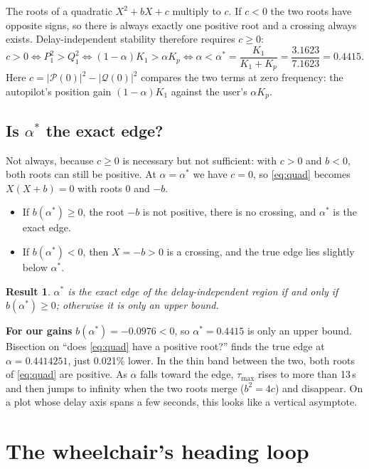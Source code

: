 \documentclass[11pt,a4paper]{article}
\newtheorem{result}{Result}
\theoremstyle{definition}
\begin{document}
The roots of a quadratic $X^2 + bX + c$ multiply to $c$. If $c < 0$ the
two roots have opposite signs, so there is always exactly one positive
root and a crossing always exists. Delay-independent stability
therefore requires $c \ge 0$:
\begin{equation}
c > 0 \iff P_1^2 > Q_1^2 \iff (1-\alpha)K_1 > \alpha K_p
\iff \alpha < \alpha^{*} = \frac{K_1}{K_1 + K_p} = \frac{3.1623}{7.1623} = 0.4415 .
\label{eq:astar}
\end{equation}
Here $c = |\mathcal{P}(0)|^2 - |\mathcal{Q}(0)|^2$ compares the two
terms at zero frequency: the autopilot's position gain $(1-\alpha)K_1$
against the user's $\alpha K_p$.

\subsection{Is \texorpdfstring{$\alpha^*$}{alpha*} the exact edge?}
Not always, because $c \ge 0$ is necessary but not sufficient: with
$c > 0$ and $b < 0$, both roots can still be positive. At
$\alpha = \alpha^*$ we have $c = 0$, so \eqref{eq:quad} becomes
$X(X + b) = 0$ with roots $0$ and $-b$.
\begin{itemize}\setlength{\itemsep}{2pt}
\item If $b(\alpha^*) \ge 0$, the root $-b$ is not positive, there is no
crossing, and $\alpha^*$ is the exact edge.
\item If $b(\alpha^*) < 0$, then $X = -b > 0$ is a crossing, and the true
edge lies slightly below $\alpha^*$.
\end{itemize}
\begin{result}
$\alpha^*$ is the exact edge of the delay-independent region if and
only if $b(\alpha^*) \ge 0$; otherwise it is only an upper bound.
\end{result}

\textbf{For our gains} $b(\alpha^*) = -0.0976 < 0$, so $\alpha^* = 0.4415$
is only an upper bound. Bisection on ``does \eqref{eq:quad} have a
positive root?'' finds the true edge at $\alpha = 0.4414251$, just
0.021\% lower. In the thin band between the two, both roots of
\eqref{eq:quad} are positive. As $\alpha$ falls toward the edge,
$\tau_{\max}$ rises to more than 13\,s and then jumps to infinity when
the two roots merge ($b^2 = 4c$) and disappear. On a plot whose delay
axis spans a few seconds, this looks like a vertical asymptote.

\section{The wheelchair's heading loop}
\label{sec:heading}
\end{document}
